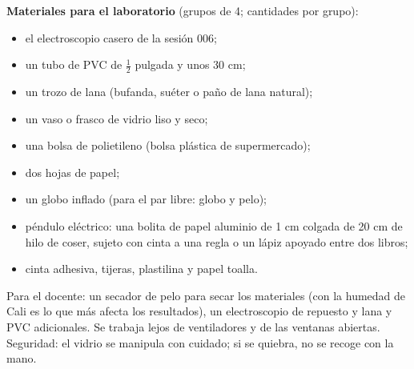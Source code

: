 \documentclass[11pt]{article}
\begin{document}
\begin{nota}
\textbf{Materiales para el laboratorio} (grupos de 4; cantidades por grupo):
\begin{itemize}
  \item el electroscopio casero de la sesión 006;
  \item un tubo de PVC de $\frac{1}{2}$ pulgada y unos 30 cm;
  \item un trozo de lana (bufanda, suéter o paño de lana natural);
  \item un vaso o frasco de vidrio liso y seco;
  \item una bolsa de polietileno (bolsa plástica de supermercado);
  \item dos hojas de papel;
  \item un globo inflado (para el par libre: globo y pelo);
  \item péndulo eléctrico: una bolita de papel aluminio de 1 cm colgada de 20 cm de hilo de
        coser, sujeto con cinta a una regla o un lápiz apoyado entre dos libros;
  \item cinta adhesiva, tijeras, plastilina y papel toalla.
\end{itemize}
Para el docente: un secador de pelo para secar los materiales (con la humedad de Cali es lo
que más afecta los resultados), un electroscopio de repuesto y lana y PVC adicionales. Se
trabaja lejos de ventiladores y de las ventanas abiertas. Seguridad: el vidrio se manipula con
cuidado; si se quiebra, no se recoge con la mano.
\end{nota}
\end{document}
